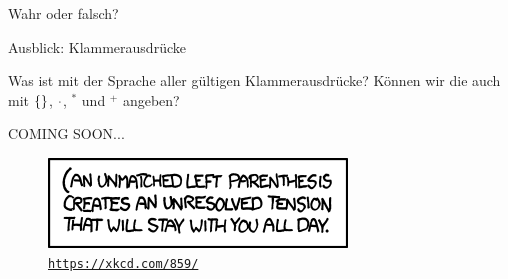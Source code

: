 \begin{frame}[t]{Wahr oder falsch?}
\end{frame}





\begin{frame}{Ausblick: Klammerausdrücke}
	
	Was ist mit der Sprache aller gültigen Klammerausdrücke? Können wir die auch mit $\left\{\right\}$, $\cdot$, ${}^*$ und ${}^+$ angeben? \\[1em]
	\pause
	
	\begin{block}{}
		\Large
		\centering
		COMING SOON... \\[1em]
	\end{block}

	\begin{figure}[H]
		\centering
		\includegraphics[scale=0.7]{xkcd/(.png}
		\vspace{-7pt}
		\caption{ \texttt{\url{https://xkcd.com/859/}} }
	\end{figure}
\end{frame}

%

